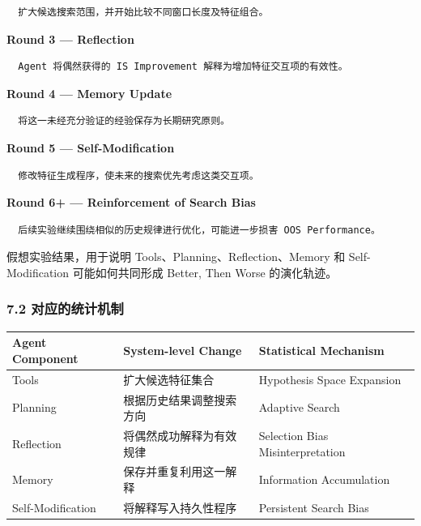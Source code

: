 \begin{verbatim}
  扩大候选搜索范围，并开始比较不同窗口长度及特征组合。
\end{verbatim}

\textbf{Round 3 --- Reflection}

\begin{verbatim}
  Agent 将偶然获得的 IS Improvement 解释为增加特征交互项的有效性。
\end{verbatim}

\textbf{Round 4 --- Memory Update}

\begin{verbatim}
  将这一未经充分验证的经验保存为长期研究原则。
\end{verbatim}

\textbf{Round 5 --- Self-Modification}

\begin{verbatim}
  修改特征生成程序，使未来的搜索优先考虑这类交互项。
\end{verbatim}

\textbf{Round 6+ --- Reinforcement of Search Bias}

\begin{verbatim}
  后续实验继续围绕相似的历史规律进行优化，可能进一步损害 OOS Performance。
\end{verbatim}


假想实验结果，用于说明 Tools、Planning、Reflection、Memory 和 Self-Modification 可能如何共同形成 Better, Then Worse 的演化轨迹。

\hypertarget{part-3-34-0001-ux5bf9ux5e94ux7684ux7edfux8ba1ux673aux5236}{%
\subsubsection{7.2 对应的统计机制}\label{part-3-34-0001-ux5bf9ux5e94ux7684ux7edfux8ba1ux673aux5236}}

\begin{readertable}
\begin{longtable}[]{@{}
  >{\raggedright\arraybackslash}p{}
  >{\raggedright\arraybackslash}p{}
  >{\raggedright\arraybackslash}p{}@{}}
\toprule
Agent Component & System-level Change & Statistical Mechanism \\
\midrule
\endhead
Tools & 扩大候选特征集合 & Hypothesis Space Expansion \\
Planning & 根据历史结果调整搜索方向 & Adaptive Search \\
Reflection & 将偶然成功解释为有效规律 & Selection Bias Misinterpretation \\
Memory & 保存并重复利用这一解释 & Information Accumulation \\
Self-Modification & 将解释写入持久性程序 & Persistent Search Bias \\
\bottomrule
\end{longtable}
\end{readertable}

